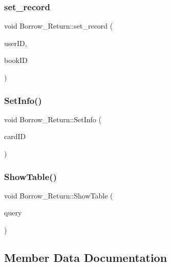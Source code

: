 \subsubsection{\texorpdfstring{set\_record}{set\_record}}
{\footnotesize\ttfamily void Borrow\+\_\+\+Return\+::set\+\_\+record (\begin{DoxyParamCaption}\item[{Q\+String}]{user\+ID,  }\item[{Q\+String}]{book\+ID }\end{DoxyParamCaption})\hspace{0.3cm}{\ttfamily [signal]}}

\mbox{\label{class_borrow___return_afd3bfd00077c0704c8b26f8e4254e176}} 
\subsubsection{\texorpdfstring{SetInfo()}{SetInfo()}}
{\footnotesize\ttfamily void Borrow\+\_\+\+Return\+::\+Set\+Info (\begin{DoxyParamCaption}\item[{Q\+String}]{card\+ID }\end{DoxyParamCaption})}

\mbox{\label{class_borrow___return_a061bb2484dacfe92218acb7d6e9494e5}} 
\subsubsection{\texorpdfstring{ShowTable()}{ShowTable()}}
{\footnotesize\ttfamily void Borrow\+\_\+\+Return\+::\+Show\+Table (\begin{DoxyParamCaption}\item[{Q\+Sql\+Query}]{query }\end{DoxyParamCaption})}



\subsection{Member Data Documentation}
\mbox{\label{class_borrow___return_a0b4d7c64ac6e275c1dce258f58ba82cd}} 
